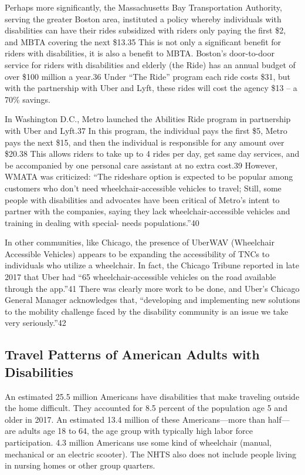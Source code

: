 \documentclass[]{article}
\begin{document}
Perhaps more significantly, the Massachusetts Bay Transportation
Authority, serving the greater Boston area, instituted a policy whereby
individuals with disabilities can have their rides subsidized with
riders only paying the first \$2, and MBTA covering the next \$13.35
This is not only a significant benefit for riders with disabilities, it
is also a benefit to MBTA. Boston's door-to-door service for riders with
disabilities and elderly (the Ride) has an annual budget of over \$100
million a year.36 Under ``The Ride'' program each ride costs \$31, but
with the partnership with Uber and Lyft, these rides will cost the
agency \$13 -- a 70\% savings.

In Washington D.C., Metro launched the Abilities Ride program in
partnership with Uber and Lyft.37 In this program, the individual pays
the first \$5, Metro pays the next \$15, and then the individual is
responsible for any amount over \$20.38 This allows riders to take up to
4 rides per day, get same day services, and be accompanied by one
personal care assistant at no extra cost.39 However, WMATA was
criticized: ``The rideshare option is expected to be popular among
customers who don't need wheelchair-accessible vehicles to travel;
Still, some people with disabilities and advocates have been critical of
Metro's intent to partner with the companies, saying they lack
wheelchair-accessible vehicles and training in dealing with special-
needs populations.''40

In other communities, like Chicago, the presence of UberWAV (Wheelchair
Accessible Vehicles) appears to be expanding the accessibility of TNCs
to individuals who utilize a wheelchair. In fact, the Chicago Tribune
reported in late 2017 that Uber had ``65 wheelchair-accessible vehicles
on the road available through the app.''41 There was clearly more work
to be done, and Uber's Chicago General Manager acknowledges that,
``developing and implementing new solutions to the mobility challenge
faced by the disability community is an issue we take very
seriously.''42

\hypertarget{travel-patterns-of-american-adults-with-disabilities}{%
\subsection{Travel Patterns of American Adults with
Disabilities}\label{travel-patterns-of-american-adults-with-disabilities}}

An estimated 25.5 million Americans have disabilities that make
traveling outside the home difficult. They accounted for 8.5 percent of
the population age 5 and older in 2017. An estimated 13.4 million of
these Americans---more than half---are adults age 18 to 64, the age
group with typically high labor force participation. 4.3 million
Americans use some kind of wheelchair (manual, mechanical or an electric
scooter). The NHTS also does not include people living in nursing homes
or other group quarters.
\end{document}

